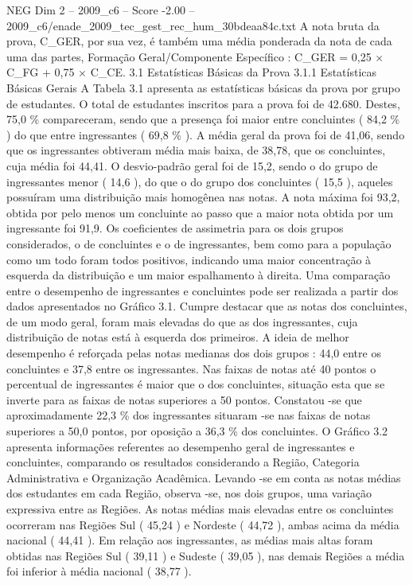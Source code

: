 \begin{textsample}{NEG Dim 2 – 2009\_c6 – Score -2.00 – 2009\_c6/enade\_2009\_tec\_gest\_rec\_hum\_30bdeaa84c.txt}
A nota bruta da prova, C\_GER, por sua vez, é também uma média ponderada da nota de cada uma das partes, Formação Geral/Componente Específico : C\_GER = 0,25 × C\_FG + 0,75 × C\_CE. 3.1 Estatísticas Básicas da Prova 3.1.1 Estatísticas Básicas Gerais A Tabela 3.1 apresenta as estatísticas básicas da prova por grupo de estudantes.
O total de estudantes inscritos para a prova foi de 42.680.
Destes, 75,0 \% compareceram, sendo que a presença foi maior entre concluintes ( 84,2 \% ) do que entre ingressantes ( 69,8 \% ).
A média geral da prova foi de 41,06, sendo que os ingressantes obtiveram média mais baixa, de 38,78, que os concluintes, cuja média foi 44,41.
O desvio-padrão geral foi de 15,2, sendo o do grupo de ingressantes menor ( 14,6 ), do que o do grupo dos concluintes ( 15,5 ), aqueles possuíram uma distribuição mais homogênea nas notas.
A nota máxima foi 93,2, obtida por pelo menos um concluinte ao passo que a maior nota obtida por um ingressante foi 91,9.
Os coeficientes de assimetria para os dois grupos considerados, o de concluintes e o de ingressantes, bem como para a população como um todo foram todos positivos, indicando uma maior concentração à esquerda da distribuição e um maior espalhamento à direita.
Uma comparação entre o desempenho de ingressantes e concluintes pode ser realizada a partir dos dados apresentados no Gráfico 3.1.
Cumpre destacar que as notas dos concluintes, de um modo geral, foram mais elevadas do que as dos ingressantes, cuja distribuição de notas está à esquerda dos primeiros.
A ideia de melhor desempenho é reforçada pelas notas medianas dos dois grupos : 44,0 entre os concluintes e 37,8 entre os ingressantes.
Nas faixas de notas até 40 pontos o percentual de ingressantes é maior que o dos concluintes, situação esta que se inverte para as faixas de notas superiores a 50 pontos.
Constatou -se que aproximadamente 22,3 \% dos ingressantes situaram -se nas faixas de notas superiores a 50,0 pontos, por oposição a 36,3 \% dos concluintes.
O Gráfico 3.2 apresenta informações referentes ao desempenho geral de ingressantes e concluintes, comparando os resultados considerando a Região, Categoria Administrativa e Organização Acadêmica.
Levando -se em conta as notas médias dos estudantes em cada Região, observa -se, nos dois grupos, uma variação expressiva entre as Regiões.
As notas médias mais elevadas entre os concluintes ocorreram nas Regiões Sul ( 45,24 ) e Nordeste ( 44,72 ), ambas acima da média nacional ( 44,41 ).
Em relação aos ingressantes, as médias mais altas foram obtidas nas Regiões Sul ( 39,11 ) e Sudeste ( 39,05 ), nas demais Regiões a média foi inferior à média nacional ( 38,77 ).

\end{textsample}
